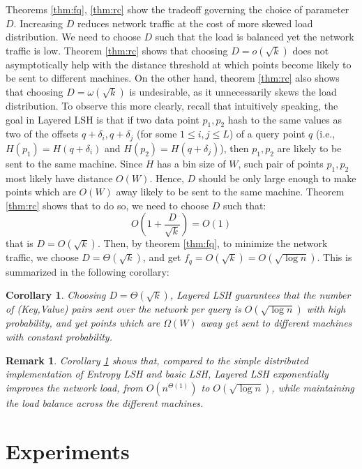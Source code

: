 \documentclass{acm_proc_article-sp}
\numberwithin{equation}{section}
\numberwithin{figure}{section}
\newtheorem{corol}[thm]{Corollary}
\newtheorem{rem}[thm]{Remark}
\begin{document}
Theorems \ref{thm:fq}, \ref{thm:rc} show the tradeoff governing the choice of parameter $D$. Increasing $D$ reduces network traffic at the cost of more skewed load distribution. We need to choose $D$ such that the load is balanced yet the network traffic is low. Theorem \ref{thm:rc} shows that choosing $D=o(\sqrt{k})$ does not asymptotically help with the distance threshold at which points become likely to be sent to different machines. On the other hand, theorem \ref{thm:rc} also shows that choosing $D=\omega(\sqrt{k})$ is undesirable, as it unnecessarily skews the load distribution. To observe this more clearly, recall that intuitively speaking, the goal in Layered LSH is that if two data point $p_1, p_2$ hash to the same values as two of the offsets $q+\delta_i, q+\delta_j$ (for some $1\leq i,j\leq L$) of a query point $q$ (i.e., $H(p_1)=H(q+\delta_i)$ and $H(p_2)=H(q+\delta_j)$), then $p_1,p_2$ are likely to be sent to the same machine. Since $H$ has a bin size of $W$, such pair of points $p_1,p_2$ most likely have distance $O(W)$. Hence, $D$ should be only large enough to make points which are $O(W)$ away likely to be sent to the same machine. Theorem \ref{thm:rc} shows that to do so, we need to choose $D$ such that:
\[
O(1+\frac{D}{\sqrt{k}}) = O(1)
\]
that is $D=O(\sqrt{k})$. Then, by theorem \ref{thm:fq}, to minimize the network traffic, we choose $D=\Theta(\sqrt{k})$, and get $f_q  = O(\sqrt{k}) = O(\sqrt{\log n})$. This is summarized in the following corollary:

\begin{corol}
\label{cor:Dsqrtk}
Choosing $D=\Theta(\sqrt{k})$, Layered LSH guarantees that the number of (Key,Value) pairs sent over the network per query is $O(\sqrt{\log n})$ with high probability, and yet points which are $\Omega(W)$ away get sent to different machines with constant probability.
\end{corol}

\begin{rem} Corollary \ref{cor:Dsqrtk} shows that, compared to the simple distributed implementation of Entropy LSH and basic LSH, Layered LSH exponentially improves the network load, from $O(n^{\Theta(1)})$ to $O(\sqrt{\log n})$, while maintaining the load balance across the different machines. 
\end{rem}


\section{Experiments}
\label{sec:exp}
\end{document}
